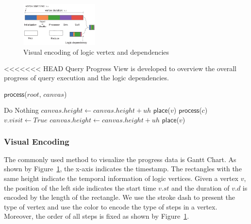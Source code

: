 \begin{figure}[t]
	\centering
	\includegraphics[width=0.35\textwidth]{figures/visualization/progressdesign.pdf}
	\vspace{-3mm}
	\caption{Visual encoding of logic vertex and dependencies}
	\label{fig:progress}
	\vspace{-3mm}
\end{figure}

<<<<<<< HEAD
Query Progress View is developed to overview the overall progress of query execution and the logic dependencies. 

\begin{algorithm}
	\caption{$\mathsf{TDAGLayout}$($R$, $canvas$)}
	\label{alg:TDAGLayout}
	\begin{algorithmic}[1]
		\State$\mathsf{process}$($root$, $canvas$)
		\EndFor
	\end{algorithmic}

\end{algorithm}

\begin{algorithm}
	\caption{$\mathsf{process}$($v$, $canvas$)}
	\label{alg:process}
	\begin{algorithmic}[1]
			\State Do Nothing
		\EndIf
				\State $canvas.height \leftarrow canvas.height + uh$
				\State $\mathsf{place}$($v$)
			\EndIf
		\Else
				\State $\mathsf{process}$($c$)
					\State $v.visit \leftarrow True$
				\EndIf
			\EndFor
				\State $canvas.height \leftarrow canvas.height + uh$
				\State $\mathsf{place}$($v$)
			\EndIf
		\EndIf
	\end{algorithmic}
\end{algorithm}




\subsubsection{Visual Encoding}
The commonly used method to visualize the progress data is Gantt Chart.
As shown by Figure~\ref{fig:progress}, the x-axis indicates the timestamp. The rectangles with the same height indicate the temporal information of logic vertices. 
Given a vertex $v$, the position of the left side indicates the start time $v.st$ and the duration of $v.d$ is encoded by the length of the rectangle. We use the stroke dash to present the type of vertex and use the color to encode the type of steps in a vertex. Moreover, the order of all steps is fixed as shown by Figure~\ref{fig:progress}.


